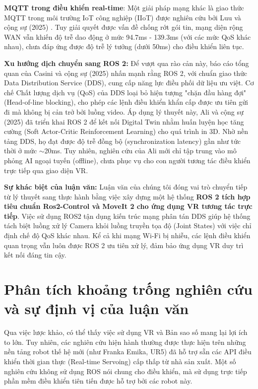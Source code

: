 \textbf{MQTT trong điều khiển real-time}: Một giải pháp mạng khác là giao thức MQTT trong môi trường IoT công nghiệp (IIoT) được nghiên cứu bởi Luu và cộng sự (2025) \cite{Luu2025EnhancingRealTime}. Tuy giải quyết được vấn đề chống rớt gói tin, mạng diện rộng WAN vẫn khiến độ trễ dao động ở mức 94.7ms - 139.3ms (với các mức QoS khác nhau), chưa đáp ứng được độ trễ lý tưởng (dưới 50ms) cho điều khiển liên tục.

\textbf{Xu hướng dịch chuyển sang ROS 2:} Để vượt qua rào cản này, báo cáo tổng quan của Casini và cộng sự (2025) \cite{casini2025survey} nhấn mạnh rằng ROS 2, với chuẩn giao thức Data Distribution Service (DDS), cung cấp năng lực điều phối dữ liệu ưu việt. Cơ chế Chất lượng dịch vụ (QoS) của DDS loại bỏ hiện tượng "chặn đầu hàng đợi" (Head-of-line blocking), cho phép các lệnh điều khiển khẩn cấp được ưu tiên gửi đi mà không bị cản trở bởi luồng video. Áp dụng lý thuyết này, Ali và cộng sự (2025) \cite{ali2025digital} đã triển khai ROS 2 để kết nối Digital Twin nhằm huấn luyện học tăng cường (Soft Actor-Critic Reinforcement Learning) cho quá trình in 3D. Nhờ nền tảng DDS, họ đạt được độ trễ đồng bộ (synchronization latency) gần như tức thời ở mức $\sim$20ms. Tuy nhiên, nghiên cứu của Ali \cite{ali2025digital} mới chỉ tập trung vào mô phỏng AI ngoại tuyến (offline), chưa phục vụ cho con người tương tác điều khiển trực tiếp qua giao diện VR.

\textbf{Sự khác biệt của luận văn:}
Luận văn của chúng tôi đóng vai trò chuyển tiếp từ lý thuyết sang thực hành bằng việc xây dựng một hệ thống \textbf{ROS 2 tích hợp tiêu chuẩn Ros2-Control và MoveIt 2 cho ứng dụng VR tương tác trực tiếp}. Việc sử dụng ROS2 tận dụng kiến trúc mạng phân tán DDS giúp hệ thống tách biệt luồng xử lý Camera khỏi luồng truyền tọa độ (Joint States) với việc chỉ định chế độ QoS khác nhau. Kể cả khi mạng Wi-Fi bị nhiễu, các lệnh điều khiển quan trọng vẫn luôn được ROS 2 ưu tiên xử lý, đảm bảo ứng dụng VR duy trì kết nối đáng tin cậy.

\section{Phân tích khoảng trống nghiên cứu và sự định vị của luận văn}

Qua việc lược khảo, có thể thấy việc sử dụng VR và Bản sao số mang lại lợi ích to lớn. Tuy nhiên, các nghiên cứu hiện hành \cite{arclab2025beavr, torrejon2026teleoperation} thường được thực hiện trên những nền tảng robot thế hệ mới (như Franka Emika, UR5) đã hỗ trợ sẵn các API điều khiển thời gian thực (Real-time Servoing) cấp thấp từ nhà sản xuất. Một số nghiên cứu không sử dụng ROS nói chung cho điều khiển, mà sử dụng trực tiếp phần mềm điều khiển tiên tiến được hỗ trợ bởi các robot này.

